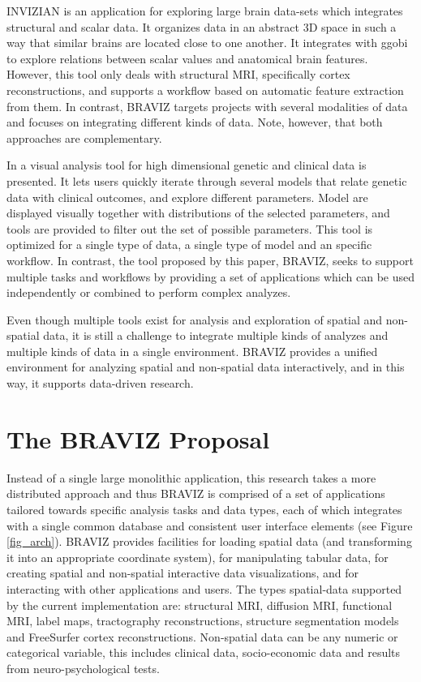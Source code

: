\documentclass[utf8,paper]{frontiersSCNS} %
\begin{document}
INVIZIAN \citep{bowman_query-based_2011,bowman_feature-similarity_2012,bowman_visual_2012} is an application for exploring large brain data-sets which integrates structural and scalar data. It organizes data in an abstract 3D space in such a way that similar brains are located close to one another. It integrates with ggobi to explore relations between scalar values and anatomical brain features. However, this tool only deals with structural MRI, specifically cortex reconstructions, and supports a workflow based on automatic feature extraction from them. In contrast, BRAVIZ targets projects with several modalities of data and focuses on integrating different kinds of data. Note, however, that both approaches are complementary.

In \citep{hinterberg_peax:_2014} a visual analysis tool for high dimensional genetic and clinical data is presented. It lets users quickly iterate through several models that relate genetic data with clinical outcomes, and explore different parameters. Model are displayed visually together with distributions of the selected parameters, and tools are provided to filter out the set of possible parameters. This tool is optimized for a single type of data, a single type of model and an specific workflow. In contrast, the tool proposed by this paper, BRAVIZ, seeks to support multiple tasks and workflows by providing a set of applications which can be used independently or combined to perform complex analyzes.

Even though multiple tools exist for analysis and exploration of spatial and non-spatial data, it is still a challenge to integrate multiple kinds of analyzes and multiple kinds of data in a single environment. BRAVIZ provides a unified environment for analyzing spatial and non-spatial data interactively, and in this way, it supports data-driven research.

\section{The BRAVIZ Proposal}

Instead of a single large monolithic application, this research takes a more distributed approach and thus BRAVIZ is comprised of a set of applications tailored towards specific analysis tasks and data types, each of which integrates with a single common database and consistent user interface elements (see Figure \ref{fig_arch}). BRAVIZ provides facilities for loading spatial data (and transforming it into an appropriate coordinate system), for manipulating tabular data, for creating spatial and non-spatial interactive data visualizations, and for interacting with other applications and users. The types spatial-data supported by the current implementation are: structural MRI, diffusion MRI, functional MRI, label maps, tractography reconstructions, structure segmentation models and FreeSurfer cortex reconstructions. Non-spatial data can be any numeric or categorical variable, this includes clinical data, socio-economic data and results from neuro-psychological tests.
\end{document}
